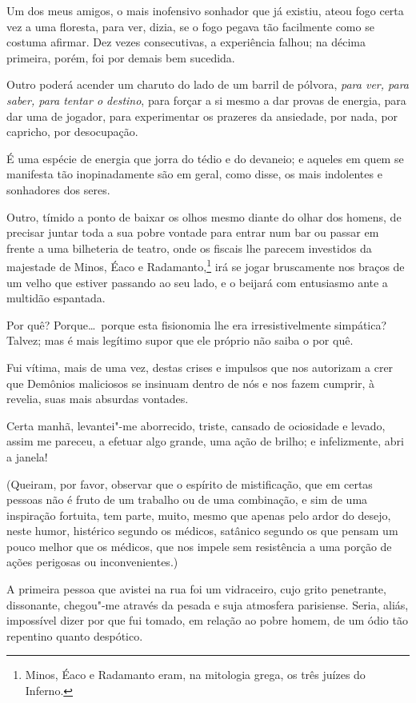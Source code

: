 Um dos meus amigos, o mais inofensivo sonhador que já existiu, ateou
fogo certa vez a uma floresta, para ver, dizia, se o fogo pegava tão facilmente como se costuma afirmar. Dez vezes consecutivas, a
experiência falhou; na décima primeira, porém, foi por demais bem
sucedida.

Outro poderá acender um charuto do lado de um barril de pólvora, \textit{para ver,
para saber, para tentar o destino}, para forçar a si mesmo a dar
provas de energia, para dar uma de jogador, para experimentar os prazeres da %
ansiedade, por nada, por capricho, por desocupação. 

É uma espécie de energia que jorra do tédio e do devaneio; e aqueles em quem se manifesta tão inopinadamente são em geral, como 
disse, os mais indolentes e sonhadores dos seres.

Outro, tímido a ponto de baixar os olhos mesmo diante do olhar dos
homens, de precisar juntar toda a sua pobre vontade
para entrar num bar ou passar em frente a uma bilheteria de teatro, onde
os fiscais lhe parecem investidos da majestade de Minos, Éaco e
Radamanto,\footnote{  Minos, Éaco e Radamanto eram, na mitologia grega, os três juízes do
Inferno.} irá se jogar bruscamente nos braços de um
velho que estiver passando ao seu lado, e o beijará com entusiasmo
ante a multidão espantada.

Por quê? Porque\ldots\  porque esta fisionomia lhe era irresistivelmente
simpática? Talvez; mas é mais legítimo supor que ele próprio não saiba o
por quê.

Fui vítima, mais de uma vez, destas crises e impulsos que nos
autorizam a crer que Demônios maliciosos se insinuam dentro de nós e
nos fazem cumprir, à revelia, suas mais absurdas vontades.

Certa manhã, levantei"-me aborrecido, triste, cansado de ociosidade e
levado, assim me pareceu, a efetuar algo grande, uma ação de brilho; e infelizmente, abri a
janela!

(Queiram, por favor, observar que o espírito de mistificação, que em
certas pessoas não é fruto de um trabalho ou de uma combinação, e sim 
de uma inspiração fortuita, tem
parte, muito, mesmo que apenas pelo
ardor do desejo, neste humor, histérico segundo os médicos, satânico
segundo os que pensam um pouco melhor que os médicos, que nos
impele sem resistência a uma porção de ações perigosas ou
inconvenientes.)

A primeira pessoa que avistei na rua foi um vidraceiro, cujo grito
penetrante, dissonante, chegou"-me através da pesada e suja atmosfera
parisiense. Seria, aliás, impossível dizer por que fui tomado, em
relação ao pobre homem, de um ódio tão repentino quanto despótico.

